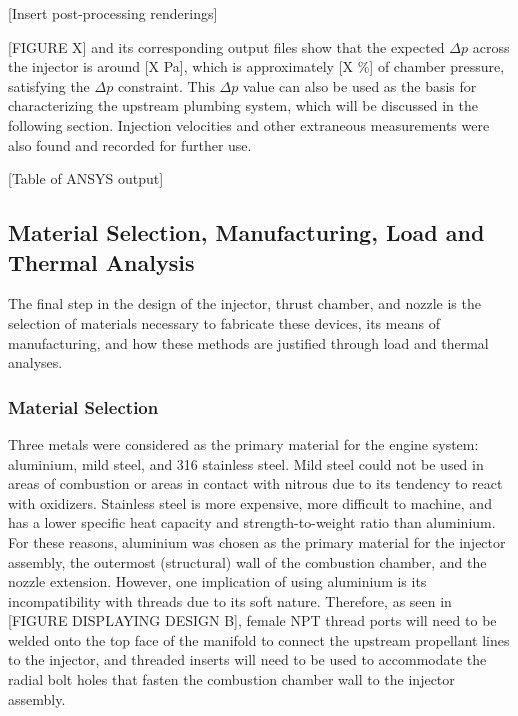 \documentclass[9pt]{article} %
\numberwithin{equation}{section} %
\begin{document}
[Insert post-processing renderings]

[FIGURE X] and its corresponding output files show that the expected $\Delta p$ across the injector is around [X Pa], which is approximately [X \%] of chamber pressure, satisfying the $\Delta p$ constraint. This $\Delta p$ value can also be used as the basis for characterizing the upstream plumbing system, which will be discussed in the following section. Injection velocities and other extraneous measurements were also found and recorded for further use. 

[Table of ANSYS output]

\subsection{Material Selection, Manufacturing, Load and Thermal Analysis}

The final step in the design of the injector, thrust chamber, and nozzle is the selection of materials necessary to fabricate these devices, its means of manufacturing, and how these methods are justified through load and thermal analyses.

\subsubsection{Material Selection}

\hspace{\parindent} Three metals were considered as the primary material for the engine system: aluminium, mild steel, and 316 stainless steel. Mild steel could not be used in areas of combustion or areas in contact with nitrous due to its tendency to react with oxidizers. Stainless steel is more expensive, more difficult to machine, and has a lower specific heat capacity and strength-to-weight ratio than aluminium. For these reasons, aluminium was chosen as the primary material for the injector assembly, the outermost (structural) wall of the combustion chamber, and the nozzle extension. However, one implication of using aluminium is its incompatibility with threads due to its soft nature. Therefore, as seen in [FIGURE DISPLAYING DESIGN B], female NPT thread ports will need to be welded onto the top face of the manifold to connect the upstream propellant lines to the injector, and threaded inserts will need to be used to accommodate the radial bolt holes that fasten the combustion chamber wall to the injector assembly.
\end{document}
